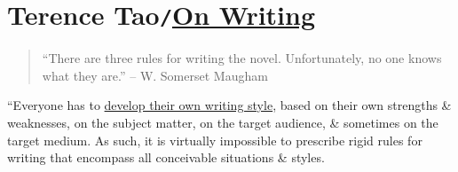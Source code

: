 \documentclass[oneside]{book}
\numberwithin{equation}{section}
\begin{document}
\chapter{Terence Tao\texttt{/}\href{https://terrytao.wordpress.com/advice-on-writing-papers/}{On Writing}}
\begin{quotation}
	``There are three rules for writing the novel. Unfortunately, no one knows what they are.'' -- W. Somerset Maugham
\end{quotation}
``Everyone has to \href{https://terrytao.wordpress.com/advice-on-writing-papers/write-in-your-own-voice/}{develop their own writing style}, based on their own strengths \& weaknesses, on the subject matter, on the target audience, \& sometimes on the target medium. As such, it is virtually impossible to prescribe rigid rules for writing that encompass all conceivable situations \& styles.
\end{document}
